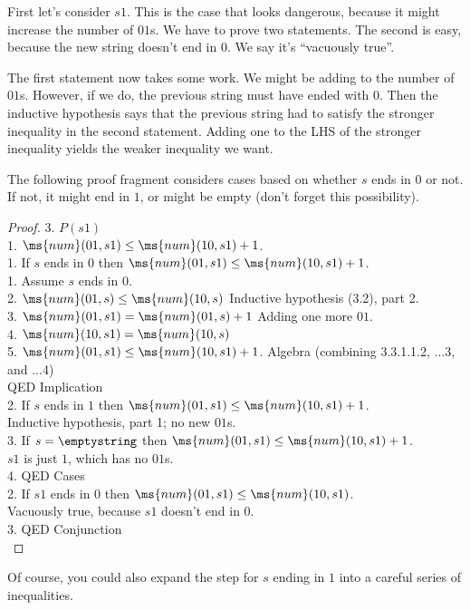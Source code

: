 \begin{definition}
First let's consider $s1$. This is the case that looks dangerous,
because it might increase the number of $01$s.  We have to prove two
statements.  The second is easy, because the new string doesn't end in
$0$.  We say it's ``vacuously true''.

The first statement now takes some work. 
We might be adding to the number of $01$s.  
However, if we do, the previous string must have ended with $0$. 
Then the inductive hypothesis says that the previous string had to
satisfy the stronger inequality in the second statement. 
Adding one to the LHS of the stronger inequality yields the weaker
inequality we want.

The following proof fragment considers cases based on whether $s$ ends
in $0$ or not.  If not, it might end in $1$, or might be empty (don't
forget this possibility).

\begin{proof}
  3. $P(s 1)$ \\
  1. $\ms{num}(01,s1) \leq \ms{num}(10,s1) + 1$. \\
  1. If $s$ ends in $0$ then $\ms{num}(01,s1) \leq\ms{num}(10,s1) + 1$. \\
  1. Assume $s$ ends in $0$. \\
  2. $\ms{num}(01,s) \leq \ms{num}(10,s)$ 
  Inductive hypothesis (3.2), part 2. \\
  3. $\ms{num}(01,s1) = \ms{num}(01,s) + 1$ 
  Adding one more $01$. \\
  4. $\ms{num}(10,s1) = \ms{num}(10,s)$ \\
  5. $\ms{num}(01,s1) \leq\ms{num}(10,s1) + 1$. 
  Algebra (combining 3.3.1.1.2, ...3, and ...4) \\
  QED 
  Implication \\
  2. If $s$ ends in $1$ then $\ms{num}(01,s1)\leq\ms{num}(10,s1) + 1$. \\
  Inductive hypothesis, part 1; no new $01$s. \\
  3. If $s = \emptystring$ then $\ms{num}(01,s1) \leq\ms{num}(10,s1)+ 1$. \\
  $s1$ is just $1$, which has no $01$s. \\
  4. QED 
  Cases \\
  2. If $s 1$ ends in $0$ then $\ms{num}(01,s1) \leq \ms{num}(10,s1)$. \\
  Vacuously true, because $s1$ doesn't end in $0$. \\
  3. QED
  Conjunction \\
\end{proof}
Of course, you could also expand the step for $s$ ending in $1$ into a
careful series of inequalities.


\end{definition}
